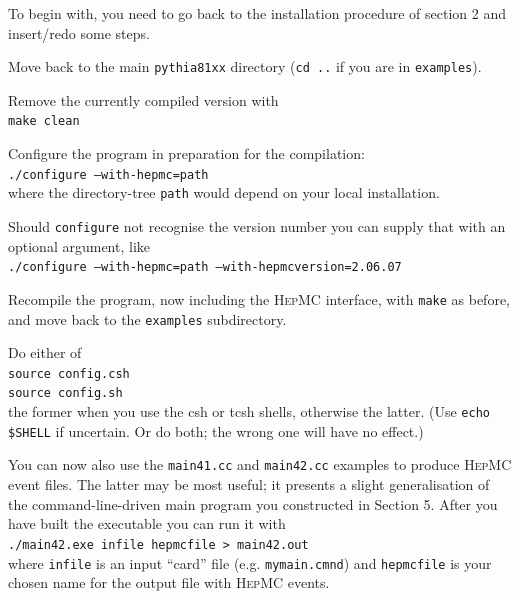 \documentclass[12pt,a4paper]{article}
\newcounter{enumct}
\newenvironment{Enumerate}{\begin{list}{\arabic{enumct}.}%
{\usecounter{enumct}\setlength{\topsep}{0.4mm}%
\setlength{\partopsep}{0.4mm}\setlength{\itemsep}{0.4mm}%
\setlength{\parsep}{0.4mm}}}{\end{list}}
\begin{document}
To begin with, you need to go back to the installation procedure 
of section 2 and insert/redo some steps.
\begin{Enumerate}
\item Move back to the main \texttt{pythia81xx} directory 
(\texttt{cd ..} if you are in \texttt{examples}).
\item Remove the currently compiled version with\\
\hspace*{10mm}\texttt{make clean}
\item Configure the program in preparation for the compilation:\\
\hspace*{10mm}\texttt{./configure --with-hepmc=path}\\
where the directory-tree \texttt{path} would depend on your local 
installation. 
\item Should \texttt{configure} not recognise the version number 
you can supply that with an optional argument, like\\
\hspace*{10mm}\texttt{./configure --with-hepmc=path %
--with-hepmcversion=2.06.07}
\item Recompile the program, now including the \textsc{HepMC} interface, 
with \texttt{make} as before, and move back to the \texttt{examples} 
subdirectory. 
\item Do either of\\
\hspace*{10mm}\texttt{source config.csh}\\
\hspace*{10mm}\texttt{source config.sh}\\
the former when you use the csh or tcsh shells, otherwise the latter.
(Use \texttt{echo \$SHELL} if uncertain. Or do both; the wrong one will 
have no effect.)  
\item You can now also use the \texttt{main41.cc} and \texttt{main42.cc}
examples to produce \textsc{HepMC} event files. The latter may be most useful;
it presents a slight generalisation of the command-line-driven main program
you constructed in Section 5. After you have built the executable you can 
run it with\\ 
\hspace*{10mm}\texttt{./main42.exe infile hepmcfile > main42.out}\\
where \texttt{infile} is an input ``card'' file (e.g. \texttt{mymain.cmnd})
and \texttt{hepmcfile} is your chosen name for the output file with 
\textsc{HepMC} events.
\end{Enumerate}
\end{document}

